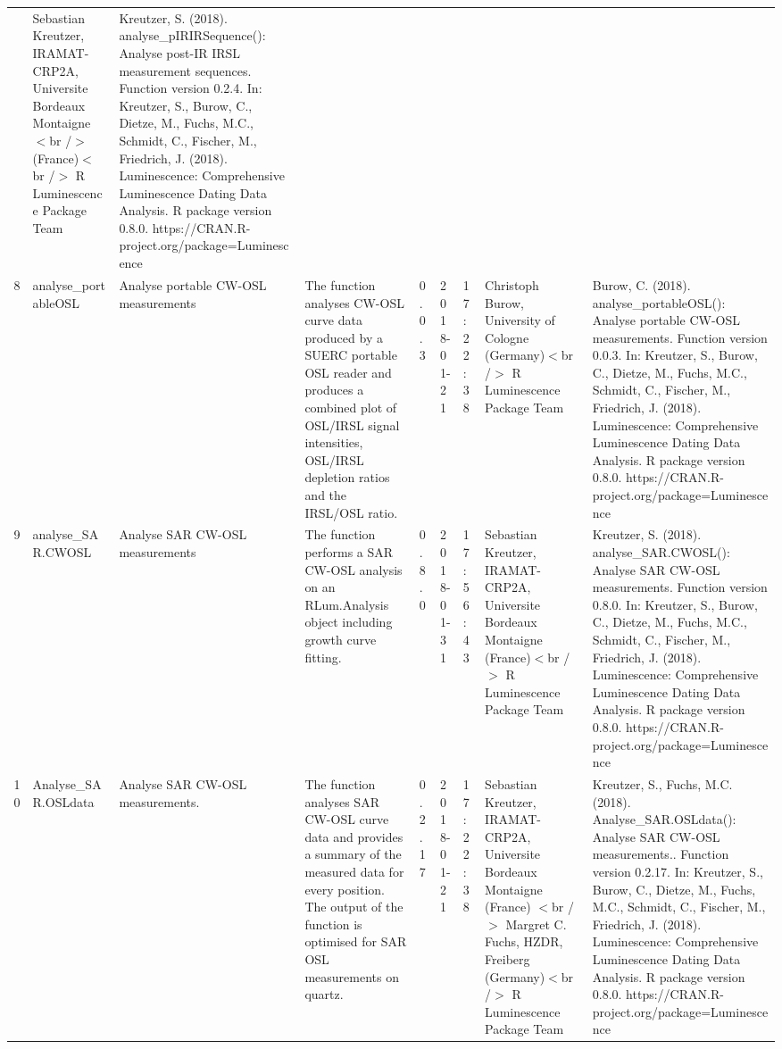 \begin{table}[ht]
\begin{tabular}{rllllllll}
 & Sebastian Kreutzer, IRAMAT-CRP2A, Universite Bordeaux Montaigne$<$br /$>$ (France)$<$br /$>$  R Luminescence Package Team & Kreutzer, S. (2018). analyse\_pIRIRSequence(): Analyse post-IR IRSL measurement sequences. Function version 0.2.4. In: Kreutzer, S., Burow, C., Dietze, M., Fuchs, M.C., Schmidt, C., Fischer, M., Friedrich, J. (2018). Luminescence: Comprehensive Luminescence Dating Data Analysis. R package version 0.8.0. https://CRAN.R-project.org/package=Luminescence
 \\ 
  8 & analyse\_portableOSL & Analyse portable CW-OSL measurements & The function analyses CW-OSL curve data produced by a SUERC portable OSL reader and produces a combined plot of OSL/IRSL signal intensities, OSL/IRSL depletion ratios and the IRSL/OSL ratio. & 0.0.3 & 2018-01-21 & 17:22:38
 & Christoph Burow, University of Cologne (Germany)$<$br /$>$  R Luminescence Package Team & Burow, C. (2018). analyse\_portableOSL(): Analyse portable CW-OSL measurements. Function version 0.0.3. In: Kreutzer, S., Burow, C., Dietze, M., Fuchs, M.C., Schmidt, C., Fischer, M., Friedrich, J. (2018). Luminescence: Comprehensive Luminescence Dating Data Analysis. R package version 0.8.0. https://CRAN.R-project.org/package=Luminescence
 \\ 
  9 & analyse\_SAR.CWOSL & Analyse SAR CW-OSL measurements & The function performs a SAR CW-OSL analysis on an RLum.Analysis  object including growth curve fitting. & 0.8.0 & 2018-01-31 & 17:56:43
 & Sebastian Kreutzer, IRAMAT-CRP2A, Universite Bordeaux Montaigne (France)$<$br /$>$  R Luminescence Package Team & Kreutzer, S. (2018). analyse\_SAR.CWOSL(): Analyse SAR CW-OSL measurements. Function version 0.8.0. In: Kreutzer, S., Burow, C., Dietze, M., Fuchs, M.C., Schmidt, C., Fischer, M., Friedrich, J. (2018). Luminescence: Comprehensive Luminescence Dating Data Analysis. R package version 0.8.0. https://CRAN.R-project.org/package=Luminescence
 \\ 
  10 & Analyse\_SAR.OSLdata & Analyse SAR CW-OSL measurements. & The function analyses SAR CW-OSL curve data and provides a summary of the measured data for every position. The output of the function is optimised for SAR OSL measurements on quartz. & 0.2.17 & 2018-01-21 & 17:22:38
 & Sebastian Kreutzer, IRAMAT-CRP2A, Universite Bordeaux Montaigne (France) $<$br /$>$ Margret C. Fuchs, HZDR, Freiberg (Germany)$<$br /$>$  R Luminescence Package Team & Kreutzer, S., Fuchs, M.C. (2018). Analyse\_SAR.OSLdata(): Analyse SAR CW-OSL measurements.. Function version 0.2.17. In: Kreutzer, S., Burow, C., Dietze, M., Fuchs, M.C., Schmidt, C., Fischer, M., Friedrich, J. (2018). Luminescence: Comprehensive Luminescence Dating Data Analysis. R package version 0.8.0. https://CRAN.R-project.org/package=Luminescence

\end{tabular}
\end{table}
